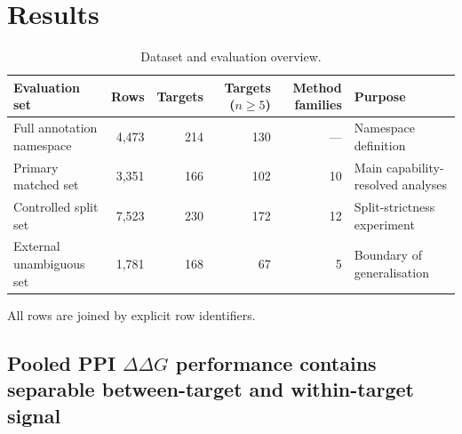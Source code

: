 \documentclass[11pt,a4paper]{article}
\begin{document}
\section{Results}

\begin{table}[htbp]
  \centering
  \small
  \begin{threeparttable}
  \caption{Dataset and evaluation overview.}
  \label{tab:overview}
  \begin{tabular}{@{}lrrrrl@{}}
    \toprule
    Evaluation set & Rows & Targets & Targets ($n \geq 5$) & Method families & Purpose \\
    \midrule
Full annotation namespace & 4,473 & 214 & 130 & --- & Namespace definition \\
Primary matched set & 3,351 & 166 & 102 & 10 & Main capability-resolved analyses \\
Controlled split set & 7,523 & 230 & 172 & 12 & Split-strictness experiment \\
External unambiguous set & 1,781 & 168 & 67 & 5 & Boundary of generalisation \\
    \bottomrule
  \end{tabular}
  \begin{tablenotes}\footnotesize
    \item All rows are joined by explicit row identifiers.
  \end{tablenotes}
  \end{threeparttable}
\end{table}

\subsection*{Pooled PPI $\Delta\Delta G$ performance contains separable between-target and
within-target signal}
\end{document}
